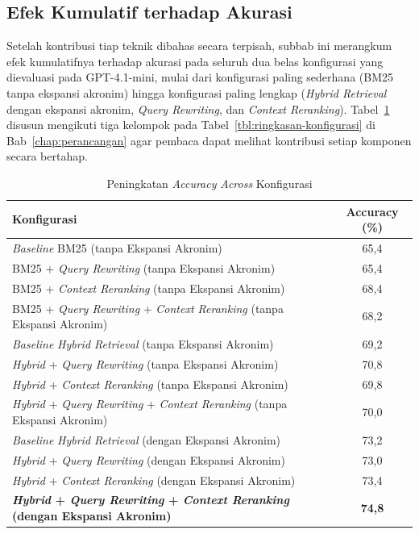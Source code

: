 \subsection{Efek Kumulatif terhadap Akurasi}
\label{subsec:progressive-accuracy}

Setelah kontribusi tiap teknik dibahas secara terpisah, subbab ini merangkum efek kumulatifnya terhadap akurasi pada seluruh dua belas konfigurasi yang dievaluasi pada GPT-4.1-mini, mulai dari konfigurasi paling sederhana (BM25 tanpa ekspansi akronim) hingga konfigurasi paling lengkap (\textit{Hybrid Retrieval} dengan ekspansi akronim, \textit{Query Rewriting}, dan \textit{Context Reranking}). Tabel~\ref{tbl:progressive-accuracy} disusun mengikuti tiga kelompok pada Tabel~\ref{tbl:ringkasan-konfigurasi} di Bab~\ref{chap:perancangan} agar pembaca dapat melihat kontribusi setiap komponen secara bertahap.

\begin{table}[H]
\centering
\small
\setlength{\tabcolsep}{5pt}
\caption{Peningkatan \textit{Accuracy} \textit{Across} Konfigurasi}
\label{tbl:progressive-accuracy}
\begin{tabular}{p{10.5cm}c}
\toprule
\textbf{Konfigurasi} & \textbf{Accuracy (\%)} \\
\midrule
\textit{Baseline} BM25 (tanpa Ekspansi Akronim)                                    & 65{,}4 \\
BM25 + \textit{Query Rewriting} (tanpa Ekspansi Akronim)                           & 65{,}4 \\
BM25 + \textit{Context Reranking} (tanpa Ekspansi Akronim)                         & 68{,}4 \\
BM25 + \textit{Query Rewriting} + \textit{Context Reranking} (tanpa Ekspansi Akronim) & 68{,}2 \\
\midrule
\textit{Baseline} \textit{Hybrid Retrieval} (tanpa Ekspansi Akronim)               & 69{,}2 \\
\textit{Hybrid} + \textit{Query Rewriting} (tanpa Ekspansi Akronim)                & 70{,}8 \\
\textit{Hybrid} + \textit{Context Reranking} (tanpa Ekspansi Akronim)              & 69{,}8 \\
\textit{Hybrid} + \textit{Query Rewriting} + \textit{Context Reranking} (tanpa Ekspansi Akronim) & 70{,}0 \\
\midrule
\textit{Baseline} \textit{Hybrid Retrieval} (dengan Ekspansi Akronim)              & 73{,}2 \\
\textit{Hybrid} + \textit{Query Rewriting} (dengan Ekspansi Akronim)               & 73{,}0 \\
\textit{Hybrid} + \textit{Context Reranking} (dengan Ekspansi Akronim)             & 73{,}4 \\
\textbf{\textit{Hybrid} + \textit{Query Rewriting} + \textit{Context Reranking} (dengan Ekspansi Akronim)} & \textbf{74{,}8} \\
\bottomrule
\end{tabular}
\end{table}

